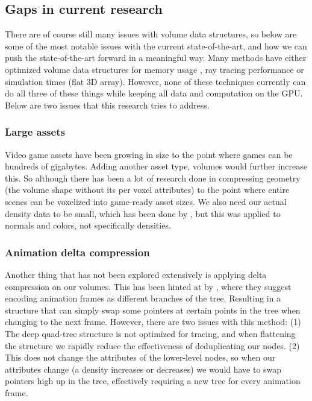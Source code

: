 \subsection{Gaps in current research} \label{related_work:gaps_in_current_research}
There are of course still many issues with volume data structures, so below are some of the most notable issues with the current state-of-the-art, and how we can push the state-of-the-art forward in a meaningful way. Many methods have either optimized volume data structures for memory usage \cite{laine2010efficient}\cite{kampe2013high}, ray tracing performance \cite{van2015real} \cite{soderlund2022ray} \cite{museth2013vdb} or simulation times (flat 3D array). However, none of these techniques currently can do all three of these things while keeping all data and computation on the GPU. Below are two issues that this research tries to address.
\subsubsection{Large assets} \label{related_work:gaps_in_current_research:large_assets}
Video game assets have been growing in size to the point where games can be hundreds of gigabytes. Adding another asset type, volumes would further increase this. So although there has been a lot of research done in compressing geometry (the volume shape without its per voxel attributes) to the point where entire scenes can be voxelized into game-ready asset sizes\cite{van2015real}\cite{museth2013vdb}. We also need our actual density data to be small, which has been done by \cite{dado2016geometry}, but this was applied to normals and colors, not specifically densities.
\subsubsection{Animation delta compression} \label{related_work:gaps_in_current_research:animation_delta_compression}
Another thing that has not been explored extensively is applying delta compression on our volumes. This has been hinted at by \cite{careil2020interactively}, where they suggest encoding animation frames as different branches of the tree. Resulting in a structure that can simply swap some pointers at certain points in the tree when changing to the next frame. However, there are two issues with this method: (1) The deep quad-tree structure is not optimized for tracing, and when flattening the structure we rapidly reduce the effectiveness of deduplicating our nodes. (2) This does not change the attributes of the lower-level nodes, so when our attributes change (a density increases or decreases) we would have to swap pointers high up in the tree, effectively requiring a new tree for every animation frame.